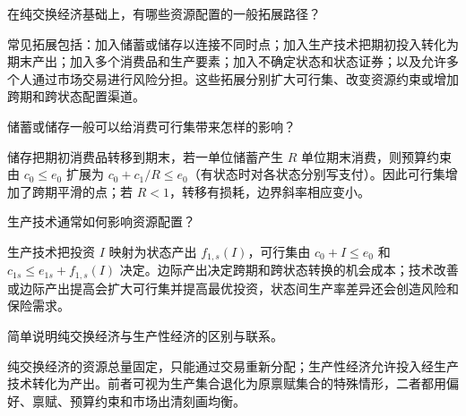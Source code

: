 
\begin{problem}
 在纯交换经济基础上，有哪些资源配置的一般拓展路径？
\end{problem}
\begin{solution}
常见拓展包括：加入储蓄或储存以连接不同时点；加入生产技术把期初投入转化为期末产出；加入多个消费品和生产要素；加入不确定状态和状态证券；以及允许多个人通过市场交易进行风险分担。这些拓展分别扩大可行集、改变资源约束或增加跨期和跨状态配置渠道。
\end{solution}
\begin{problem}
 储蓄或储存一般可以给消费可行集带来怎样的影响？
\end{problem}
\begin{solution}
储存把期初消费品转移到期末，若一单位储蓄产生 $R$ 单位期末消费，则预算约束由 $c_0\le e_0$ 扩展为 $c_0+c_1/R\le e_0$（有状态时对各状态分别写支付）。因此可行集增加了跨期平滑的点；若 $R<1$，转移有损耗，边界斜率相应变小。
\end{solution}
\begin{problem}
 生产技术通常如何影响资源配置？
\end{problem}
\begin{solution}
生产技术把投资 $I$ 映射为状态产出 $f_{1,s}(I)$，可行集由 $c_0+I\le e_0$ 和 $c_{1s}\le e_{1s}+f_{1,s}(I)$ 决定。边际产出决定跨期和跨状态转换的机会成本；技术改善或边际产出提高会扩大可行集并提高最优投资，状态间生产率差异还会创造风险和保险需求。
\end{solution}
\begin{problem}
 简单说明纯交换经济与生产性经济的区别与联系。
\end{problem}
\begin{solution}
纯交换经济的资源总量固定，只能通过交易重新分配；生产性经济允许投入经生产技术转化为产出。前者可视为生产集合退化为原禀赋集合的特殊情形，二者都用偏好、禀赋、预算约束和市场出清刻画均衡。
\end{solution}

